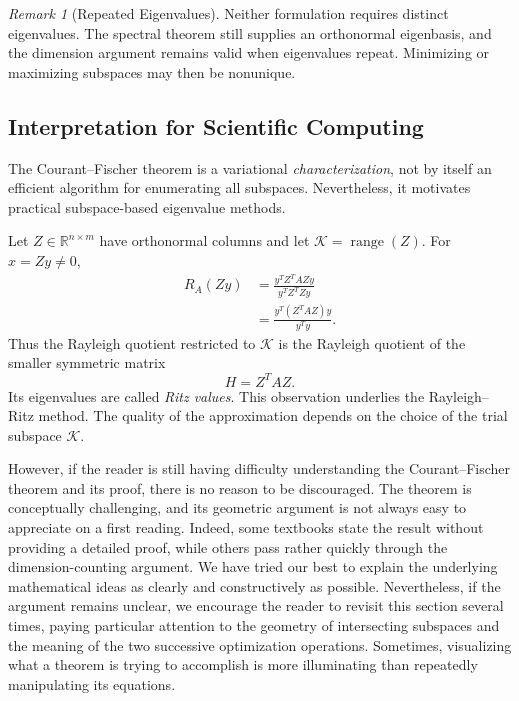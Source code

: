 \documentclass[14pt,letterpaper]{article}
\theoremstyle{plain}
\theoremstyle{definition}
\theoremstyle{remark}
\newtheorem{remark}[theorem]{Remark}
\newcommand{\R}{\mathbb{R}}
\DeclareMathOperator{\range}{range}
\begin{document}
\begin{remark}[Repeated Eigenvalues]
Neither formulation requires distinct eigenvalues.
The spectral theorem still supplies an orthonormal
eigenbasis, and the dimension argument remains valid
when eigenvalues repeat. Minimizing or maximizing
subspaces may then be nonunique.
\end{remark}

\subsection{Interpretation for Scientific Computing}
\label{subsec:courant_numerical}

The Courant--Fischer theorem is a variational
\emph{characterization}, not by itself an efficient
algorithm for enumerating all subspaces. Nevertheless,
it motivates practical subspace-based eigenvalue methods.

Let $Z\in\R^{n\times m}$ have orthonormal columns and
let $\mathcal K=\range(Z)$. For $x=Zy\neq0$,
\[
\begin{aligned}
R_A(Zy)
&=\frac{y^TZ^TAZy}{y^TZ^TZy}\\
&=\frac{y^T(Z^TAZ)y}{y^Ty}.
\end{aligned}
\]
Thus the Rayleigh quotient restricted to
$\mathcal K$ is the Rayleigh quotient of the smaller
symmetric matrix
\[
\boxed{H=Z^TAZ.}
\]
Its eigenvalues are called \emph{Ritz values}.
This observation underlies the Rayleigh--Ritz method.
The quality of the approximation depends on the
choice of the trial subspace $\mathcal K$.



However, if the reader is still having difficulty
understanding the Courant--Fischer theorem and its
proof, there is no reason to be discouraged.
The theorem is conceptually challenging, and its
geometric argument is not always easy to appreciate
on a first reading. Indeed, some textbooks state
the result without providing a detailed proof,
while others pass rather quickly through the
dimension-counting argument. We have tried our
best to explain the underlying mathematical ideas
as clearly and constructively as possible.
Nevertheless, if the argument remains unclear,
we encourage the reader to revisit this section
several times, paying particular attention to
the geometry of intersecting subspaces and the
meaning of the two successive optimization
operations. Sometimes, visualizing what a theorem
is trying to accomplish is more illuminating
than repeatedly manipulating its equations.
\end{document}
